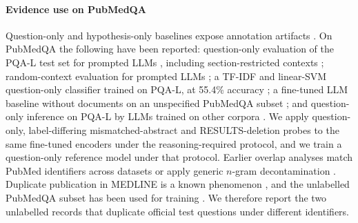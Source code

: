 \paragraph{Evidence use on PubMedQA}
Question-only and hypothesis-only baselines expose annotation artifacts
\citep{gururangan2018annotation,poliak2018hypothesis,kaushik2018reading}. On PubMedQA the following have been reported:
question-only evaluation of the PQA-L test set for prompted LLMs \citep{lala2023paperqa,xiong2024mirage},
including section-restricted contexts \citep{sadanandan2026cot};
random-context evaluation for prompted LLMs \citep{wen2024characterizing};
a TF-IDF and linear-SVM question-only classifier trained on PQA-L, at 55.4\% accuracy \citep{huang2025selfreflective};
a fine-tuned LLM baseline without documents on an unspecified PubMedQA subset \citep{zhang2024raft};
and question-only inference on PQA-L by LLMs trained on other corpora \citep{xiao2025kailin}.
We apply question-only, label-differing mismatched-abstract and RESULTS-deletion probes to the same fine-tuned
encoders under the reasoning-required protocol, and we train a question-only reference model under that
protocol. Earlier overlap analyses match PubMed identifiers across datasets \citep{fries2022bigbio} or apply
generic $n$-gram decontamination \citep{theimerlienhard2026openmeditron}. Duplicate publication in MEDLINE is a
known phenomenon \citep{errami2008tale}, and the unlabelled PubMedQA subset has been used for training
\citep{luo2022biogpt}. We therefore report the two unlabelled records that duplicate official test questions
under different identifiers.
